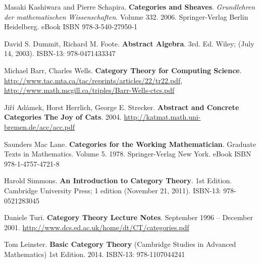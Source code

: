 \documentclass[10pt]{amsart}
\begin{document}
\begin{thebibliography}{9}

Masaki Kashiwara and Pierre Schapira. \textbf{Categories and Sheaves}.  \emph{Grundlehren der mathematischen Wissenschaften}.  Volume 332.  2006. Springer-Verlag Berlin Heidelberg.  eBook ISBN 978-3-540-27950-1


David S. Dummit, Richard M. Foote. \textbf{Abstract Algebra}. 3rd. Ed.  Wiley; (July 14, 2003). ISBN-13: 978-0471433347 

Michael Barr, Charles Wells.  \textbf{Category Theory for Computing Science}.  \url{http://www.tac.mta.ca/tac/reprints/articles/22/tr22.pdf}, \url{http://www.math.mcgill.ca/triples/Barr-Wells-ctcs.pdf}
 
Ji\v{r}\'{i} Ad\'{a}mek, Horst Herrlich, George E. Strecker.   \textbf{Abstract and Concrete Categories The Joy of Cats}. 2004.  \url{http://katmat.math.uni-bremen.de/acc/acc.pdf}

Saunders Mac Lane. \textbf{Categories for the Working Mathematician}. Graduate Texts in Mathematics. Volume 5. 1978. Springer-Verlag New York. eBook ISBN
978-1-4757-4721-8

Harold Simmons. \textbf{An Introduction to Category Theory}. 1st Edition. Cambridge University Press; 1 edition (November 21, 2011). ISBN-13: 978-0521283045

Daniele Turi. \textbf{Category Theory Lecture Notes}.  September 1996 – December 2001.  \url{http://www.dcs.ed.ac.uk/home/dt/CT/categories.pdf}

Tom Leinster.  \textbf{Basic Category Theory} (Cambridge Studies in Advanced Mathematics) 1st Edition.  2014.  ISBN-13: 978-1107044241


\end{thebibliography}
\end{document}
